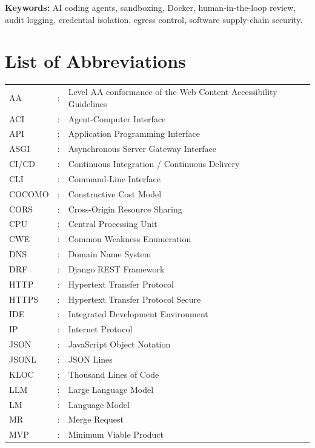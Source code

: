 \documentclass[12pt,a4paper,oneside]{report}
\begin{document}
\vspace{0.15in}
\noindent\textbf{Keywords:} AI coding agents, sandboxing, Docker, human-in-the-loop review, audit logging, credential isolation, egress control, software supply-chain security.
\clearpage

\tableofcontents
\clearpage
\listoffigures
\clearpage
\listoftables
\clearpage

\chapter*{List of Abbreviations}\label{list-of-abbreviations}
\begin{longtable}{@{}p{1.1in}@{}p{0.25in}@{}p{4.9in}@{}}
AA &: & Level AA conformance of the Web Content Accessibility Guidelines \\[2pt]
ACI &: & Agent-Computer Interface \\[2pt]
API &: & Application Programming Interface \\[2pt]
ASGI &: & Asynchronous Server Gateway Interface \\[2pt]
CI/CD &: & Continuous Integration / Continuous Delivery \\[2pt]
CLI &: & Command-Line Interface \\[2pt]
COCOMO &: & Constructive Cost Model \\[2pt]
CORS &: & Cross-Origin Resource Sharing \\[2pt]
CPU &: & Central Processing Unit \\[2pt]
CWE &: & Common Weakness Enumeration \\[2pt]
DNS &: & Domain Name System \\[2pt]
DRF &: & Django REST Framework \\[2pt]
HTTP &: & Hypertext Transfer Protocol \\[2pt]
HTTPS &: & Hypertext Transfer Protocol Secure \\[2pt]
IDE &: & Integrated Development Environment \\[2pt]
IP &: & Internet Protocol \\[2pt]
JSON &: & JavaScript Object Notation \\[2pt]
JSONL &: & JSON Lines \\[2pt]
KLOC &: & Thousand Lines of Code \\[2pt]
LLM &: & Large Language Model \\[2pt]
LM &: & Language Model \\[2pt]
MR &: & Merge Request \\[2pt]
MVP &: & Minimum Viable Product \\[2pt]

\end{longtable}
\end{document}
